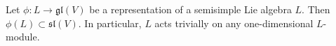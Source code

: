 Let $\phi: L \rightarrow \mathfrak{gl}(V)$ be a representation of a semisimple Lie algebra $L$. Then $\phi(L) \subset \mathfrak{sl}(V)$. In particular, $L$ acts trivially on any one-dimensional $L$-module.
